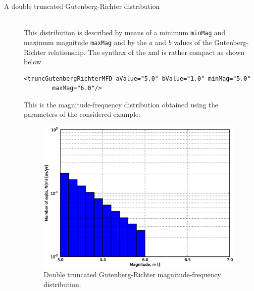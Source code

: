 \begin{description}
\begin{figure}[!ht]
\end{figure}
%
\item[A double truncated Gutenberg-Richter distribution] \hfill \\
    This distribution is de\-scribed by means of a minimum \texttt{minMag}
    and maximum magnitude \texttt{maxMag} and by the $a$ and $b$ values 
    of the Gutenberg-Richter relationship. The synthax of the xml is 
    rather compact as shown below
\begin{Verbatim}[frame=single, commandchars=\\\{\}, fontsize=\footnotesize]
<truncGutenbergRichterMFD aValue="5.0" bValue="1.0" minMag="5.0" 
        maxMag="6.0"/>
\end{Verbatim}
    This is the magnitude-frequency distribution obtained using the 
    parameters of the considered example:
\begin{figure}[!ht]
\centering
\includegraphics[width=12cm]{./figures/hazard/dt_mfd.eps}
\caption{Double truncated Gutenberg-Richter magnitude-frequency distribution.}
\label{fig:dt_gr_mfd}
\end{figure}
%
%

\end{description}
